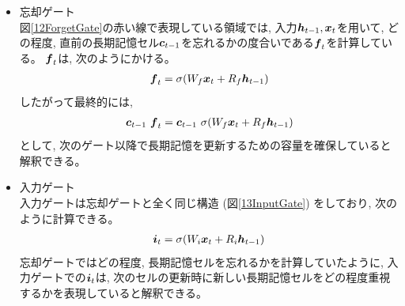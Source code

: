 \begin{itemize}
  \item 忘却ゲート\\
  図\ref{12ForgetGate}の赤い線で表現している領域では, 入力${\mbox{\boldmath{$h$}}}_{t-1},{\mbox{\boldmath{$x$}}}_t$を用いて, どの程度, 直前の長期記憶セル${\mbox{\boldmath{$c$}}}_{t-1}$を忘れるかの度合いである${\mbox{\boldmath{$f$}}}_{t}$を計算している。
  ${\mbox{\boldmath{$f$}}}_{t}$は, 次のようにかける。
\begin{equation}
 \begin{split}
  {\mbox{\boldmath{$f$}}}_{t} = \sigma (W_f {\mbox{\boldmath{$x$}}}_t + R_f {\mbox{\boldmath{$h$}}}_{t-1})
 \end{split}
\end{equation}  
  したがって最終的には, 
\begin{equation}
 \begin{split}
  {\mbox{\boldmath{$c$}}}_{t-1} \  {\mbox{\boldmath{$f$}}}_{t} 
  = {\mbox{\boldmath{$c$}}}_{t-1} \  \sigma (W_f {\mbox{\boldmath{$x$}}}_t + R_f {\mbox{\boldmath{$h$}}}_{t-1})
 \end{split}
\end{equation}
  として, 次のゲート以降で長期記憶を更新するための容量を確保していると解釈できる。

  \item 入力ゲート\\
  入力ゲートは忘却ゲートと全く同じ構造 (図\ref{13InputGate}) をしており, 次のように計算できる。
\begin{equation}
 \begin{split}
  {\mbox{\boldmath{$i$}}}_{t} = \sigma (W_i {\mbox{\boldmath{$x$}}}_t + R_i {\mbox{\boldmath{$h$}}}_{t-1})
 \end{split}
\end{equation}
  忘却ゲートではどの程度, 長期記憶セルを忘れるかを計算していたように, 入力ゲートでの${\mbox{\boldmath{$i$}}}_{t}$は, 次のセルの更新時に新しい長期記憶セルをどの程度重視するかを表現していると解釈できる。
    

\end{itemize}
